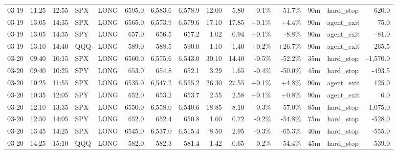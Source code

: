 \documentclass[11pt,a4paper,twoside]{article}
\begin{document}
\begin{landscape}
\begin{center}
\begin{longtable}{>{\color{txtmain}}l l l l l r r r r r r r r >{\color{txtmain}}l r}
03-19 & 11:25 & 12:55 & SPX & LONG & 6595.0 & 6,583.6 & 6,578.9 & 12.00 & 5.80 & \textcolor{lossred}{-0.1\%} & \textcolor{lossred}{-51.7\%} & 90m & hard\_stop & \textcolor{lossred}{-620.0} \\
03-19 & 13:05 & 14:35 & SPX & LONG & 6565.0 & 6,573.9 & 6,579.6 & 17.10 & 17.85 & \textcolor{wingreen}{+0.1\%} & \textcolor{wingreen}{+4.4\%} & 90m & agent\_exit & \textcolor{wingreen}{75.0} \\
03-19 & 13:05 & 14:35 & SPY & LONG & 657.0 & 656.5 & 657.2 & 1.02 & 0.94 & \textcolor{wingreen}{+0.1\%} & \textcolor{lossred}{-8.8\%} & 90m & agent\_exit & \textcolor{lossred}{-81.0} \\
03-19 & 13:10 & 14:40 & QQQ & LONG & 589.0 & 588.5 & 590.0 & 1.10 & 1.40 & \textcolor{wingreen}{+0.2\%} & \textcolor{wingreen}{+26.7\%} & 90m & agent\_exit & \textcolor{wingreen}{265.5} \\
03-20 & 09:40 & 10:15 & SPX & LONG & 6560.0 & 6,575.6 & 6,543.0 & 30.10 & 14.40 & \textcolor{lossred}{-0.5\%} & \textcolor{lossred}{-52.2\%} & 35m & hard\_stop & \textcolor{lossred}{-1,570.0} \\
03-20 & 09:40 & 10:25 & SPY & LONG & 653.0 & 654.8 & 652.1 & 3.29 & 1.65 & \textcolor{lossred}{-0.4\%} & \textcolor{lossred}{-50.0\%} & 45m & hard\_stop & \textcolor{lossred}{-493.5} \\
03-20 & 10:25 & 11:55 & SPX & LONG & 6535.0 & 6,547.2 & 6,555.2 & 26.30 & 27.55 & \textcolor{wingreen}{+0.1\%} & \textcolor{wingreen}{+4.8\%} & 90m & agent\_exit & \textcolor{wingreen}{125.0} \\
03-20 & 10:35 & 12:05 & SPY & LONG & 652.0 & 653.2 & 653.7 & 2.55 & 2.58 & \textcolor{wingreen}{+0.1\%} & \textcolor{wingreen}{+0.8\%} & 90m & agent\_exit & \textcolor{wingreen}{6.0} \\
03-20 & 12:10 & 13:35 & SPX & LONG & 6550.0 & 6,558.0 & 6,540.6 & 18.85 & 8.10 & \textcolor{lossred}{-0.3\%} & \textcolor{lossred}{-57.0\%} & 85m & hard\_stop & \textcolor{lossred}{-1,075.0} \\
03-20 & 12:50 & 14:05 & SPY & LONG & 652.0 & 652.4 & 650.8 & 1.60 & 0.72 & \textcolor{lossred}{-0.2\%} & \textcolor{lossred}{-54.8\%} & 75m & hard\_stop & \textcolor{lossred}{-528.0} \\
03-20 & 13:45 & 14:25 & SPX & LONG & 6545.0 & 6,537.0 & 6,515.4 & 8.50 & 2.95 & \textcolor{lossred}{-0.3\%} & \textcolor{lossred}{-65.3\%} & 40m & hard\_stop & \textcolor{lossred}{-555.0} \\
03-20 & 14:25 & 15:10 & QQQ & LONG & 582.0 & 582.3 & 581.4 & 1.42 & 0.65 & \textcolor{lossred}{-0.2\%} & \textcolor{lossred}{-54.4\%} & 45m & hard\_stop & \textcolor{lossred}{-539.0} \\

\end{longtable}
\end{center}
\end{landscape}
\end{document}
